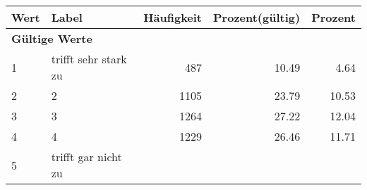      \begin{longtable}{lXrrr}
     \toprule
     \textbf{Wert} & \textbf{Label} & \textbf{Häufigkeit} & \textbf{Prozent(gültig)} & \textbf{Prozent} \\
     \endhead
     \midrule
     \multicolumn{5}{l}{\textbf{Gültige Werte}}\\

     1 &
     \multicolumn{1}{X}{ trifft sehr stark zu   } &


       \num{487} &
       \num[round-mode=places,round-precision=2]{10,49} &
         \num[round-mode=places,round-precision=2]{4,64} \\

     2 &
     \multicolumn{1}{X}{ 2   } &


       \num{1105} &
       \num[round-mode=places,round-precision=2]{23,79} &
         \num[round-mode=places,round-precision=2]{10,53} \\

     3 &
     \multicolumn{1}{X}{ 3   } &


       \num{1264} &
       \num[round-mode=places,round-precision=2]{27,22} &
         \num[round-mode=places,round-precision=2]{12,04} \\

     4 &
     \multicolumn{1}{X}{ 4   } &


       \num{1229} &
       \num[round-mode=places,round-precision=2]{26,46} &
         \num[round-mode=places,round-precision=2]{11,71} \\

     5 &
     \multicolumn{1}{X}{ trifft gar nicht zu   } &



\end{longtable}
